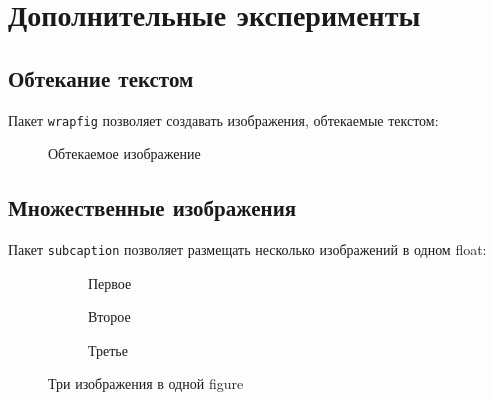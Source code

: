\documentclass[12pt,a4paper]{article}
\begin{document}
\section{Дополнительные эксперименты}

\subsection{Обтекание текстом}

Пакет \texttt{wrapfig} позволяет создавать изображения, обтекаемые текстом:

\begin{figure}
\centering
{}
\caption{Обтекаемое изображение}
\label{fig:wrap}
\end{figure}

\lipsum[7]

\subsection{Множественные изображения}

Пакет \texttt{subcaption} позволяет размещать несколько изображений в одном float:

\begin{figure}[h]
\centering
\begin{subfigure}{0.3\textwidth}
    \centering
    \caption{Первое}
    \label{fig:sub1}
\end{subfigure}
\hfill
\begin{subfigure}{0.3\textwidth}
    \centering
    \caption{Второе}
    \label{fig:sub2}
\end{subfigure}
\hfill
\begin{subfigure}{0.3\textwidth}
    \centering
    \caption{Третье}
    \label{fig:sub3}
\end{subfigure}
\caption{Три изображения в одной figure}
\label{fig:multiple}
\end{figure}
\end{document}
